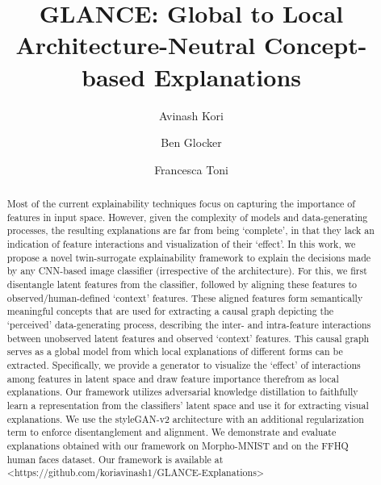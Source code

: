 \documentclass{llncs}
\title{GLANCE: Global to Local Architecture-Neutral Concept-based Explanations}
\author{Avinash Kori\inst{1} \and Ben Glocker\inst{2} \and Francesca Toni\inst{3}
}
\institute{Department of Computing \email{a.kori21@ic.ac.uk} \and Department of Computing \email{b.glocker@ic.ac.uk} \and Department of Computing \email{f.toni@ic.ac.uk}
}
\begin{document}
\maketitle

\begin{abstract}
Most of the current explainability techniques focus on capturing the importance of features in input space. However, given the complexity of models and data-generating processes, the resulting explanations are far from being `complete', in that they lack an indication of feature interactions and visualization of their `effect'. In this work, we propose a novel twin-surrogate explainability framework to explain the decisions made by any CNN-based image classifier (irrespective of the architecture). For this, we first disentangle latent features from the classifier, followed by aligning these features to observed/human-defined `context' features. These aligned features form semantically meaningful concepts that are used for extracting a causal graph depicting the `perceived' data-generating process, describing the inter- and intra-feature interactions between unobserved latent features and observed `context' features. This causal graph serves as a global model from which local explanations of different forms can be extracted. Specifically, we provide a generator to visualize the `effect' of interactions among features in latent space and draw feature importance therefrom as local explanations. Our framework utilizes adversarial knowledge distillation to faithfully learn a representation from the classifiers' latent space and use it for extracting visual explanations. We use the styleGAN-v2 architecture with an additional regularization term to enforce disentanglement and alignment. We demonstrate and evaluate explanations obtained with our framework on Morpho-MNIST and on the FFHQ human faces dataset. Our framework is available at <https://github.com/koriavinash1/GLANCE-Explanations>
\end{abstract}
\end{document}

